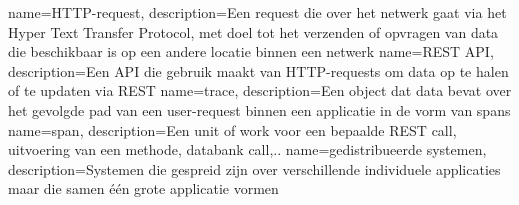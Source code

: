 	{
		name={HTTP-request},
		description={Een request die over het netwerk gaat via het Hyper Text Transfer Protocol, met doel tot het verzenden of opvragen van data die beschikbaar is op een andere locatie binnen een netwerk}
	}
	{
		name={REST API},
		description={Een \gls{API} die gebruik maakt van HTTP-requests om data op te halen of te updaten via REST}
	}
	{
		name={trace},
		description={Een object dat data bevat over het gevolgde pad van een user-request binnen een applicatie in de vorm van spans}
	}
	{
		name={span},
		description={Een unit of work voor een bepaalde REST call, uitvoering van een methode, databank call,..}
	}
	{
		name={gedistribueerde systemen},
		description={Systemen die gespreid zijn over verschillende individuele applicaties maar die samen één grote applicatie vormen}
	}

